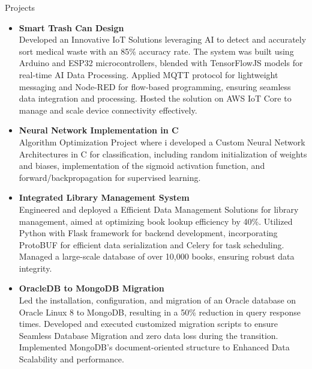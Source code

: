 \documentclass{resume}
\begin{document}
\begin{rSection}{Projects}
    \vspace{-0.25em}
    \newcommand\tab[1][1cm]{\hspace*{#1}}
\begin{itemize}[leftmargin=*,label= ]
    \item \textbf{\large Smart Trash Can Design} \\    \tab Developed an Innovative IoT Solutions leveraging AI to detect and accurately sort medical waste with an 85\% accuracy rate. The system was built using Arduino and ESP32 microcontrollers, blended with TensorFlowJS models for real-time AI Data Processing. Applied MQTT protocol for lightweight messaging and Node-RED for flow-based programming, ensuring seamless data integration and processing. Hosted the solution on AWS IoT Core to manage and scale device connectivity effectively.
    
    \item \textbf{\large Neural Network Implementation in C} \\    \tab Algorithm Optimization Project where i developed a Custom Neural Network Architectures in C for classification, including random initialization of weights and biases, implementation of the sigmoid activation function, and forward/backpropagation for supervised learning.
    
    \item \textbf{\large Integrated Library Management System} \\     \tab  Engineered and deployed a Efficient Data Management Solutions for library management, aimed at optimizing book lookup efficiency by 40\%. Utilized Python with Flask framework for backend development, incorporating ProtoBUF for efficient data serialization and Celery for task scheduling. Managed a large-scale database of over 10,000 books, ensuring robust data integrity.
    
    \item \textbf{\large OracleDB to MongoDB Migration} \\    \tab  Led the installation, configuration, and migration of an Oracle database on Oracle Linux 8 to MongoDB, resulting in a 50\% reduction in query response times. Developed and executed customized migration scripts to ensure Seamless Database Migration and zero data loss during the transition. Implemented MongoDB's document-oriented structure to Enhanced Data Scalability and performance.
    

\end{itemize}
\end{rSection}
\end{document}
